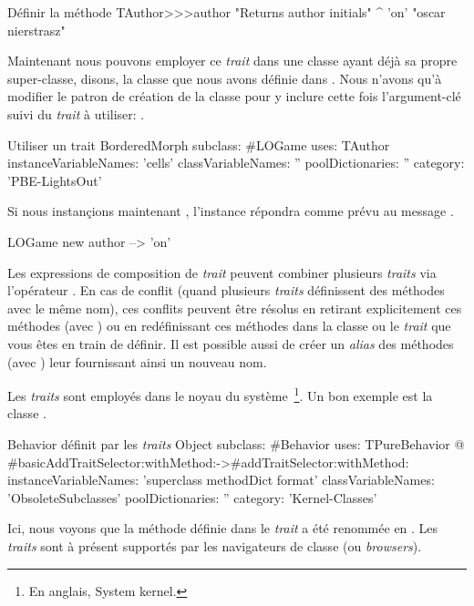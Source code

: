 \documentclass[a4paper,10pt,twoside]{book}
\begin{document}
\begin{method}[author]{Définir la méthode }
TAuthor>>>author
    "Returns author initials"
	^ 'on'    "oscar nierstrasz"
\end{method}

\noindent
Maintenant nous pouvons employer ce \emph{trait} dans une classe ayant déjà sa propre super-classe, disons, la classe  que nous avons définie dans .
Nous n'avons qu'à modifier le patron de création de la classe  pour y inclure cette fois l'argument-clé  suivi du \emph{trait} à utiliser: .

\begin{classdef}[sbegamewithtrait]{Utiliser un trait}
BorderedMorph subclass: #LOGame
	uses: TAuthor
	instanceVariableNames: 'cells'
	classVariableNames: ''
	poolDictionaries: ''
	category: 'PBE-LightsOut'
\end{classdef}

Si nous instançions maintenant , l'instance répondra comme prévu au message .

\begin{code}{}
LOGame new author --> 'on'
\end{code}

Les expressions de composition de \emph{trait} peuvent combiner plusieurs \emph{traits} via l'opérateur \ct{+}.
En cas de conflit (\ie quand plusieurs \emph{traits} définissent des méthodes avec le même nom), ces conflits peuvent être résolus en retirant explicitement ces méthodes (avec \ct{-}) ou en redéfinissant ces méthodes dans la classe ou le \emph{trait} que vous êtes en train de définir.
Il est possible aussi de créer un \emph{alias} des méthodes (avec ) 
leur fournissant ainsi un nouveau nom.

Les \emph{traits} sont employés dans le noyau du système~\footnote{En anglais, System kernel.}.
Un bon exemple est la classe \mbox{.}

\begin{classdef}[behaviorwithtraits]{Behavior définit par les \emph{traits}}
Object subclass: #Behavior
	uses: TPureBehavior @ {#basicAddTraitSelector:withMethod:->#addTraitSelector:withMethod:}
	instanceVariableNames: 'superclass methodDict format'
	classVariableNames: 'ObsoleteSubclasses'
	poolDictionaries: ''
	category: 'Kernel-Classes'
\end{classdef}
\noindent
Ici, nous voyons que la méthode  définie dans le \emph{trait}  a été renommée en \mbox{.}
Les \emph{traits} sont à présent supportés par les navigateurs de classe (ou \emph{browsers}).
\end{document}

